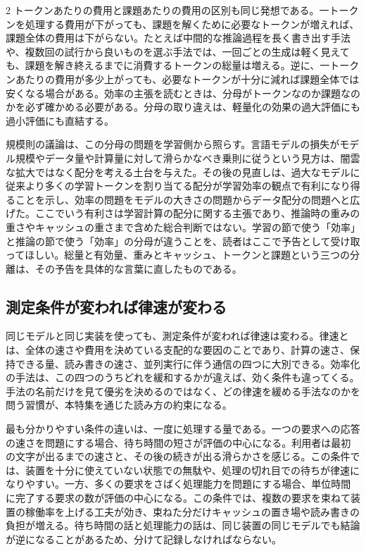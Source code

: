 \documentclass[lualatex,a4paper,10pt]{jlreq}
\begin{document}
\begin{multicols}{2}
トークンあたりの費用と課題あたりの費用の区別も同じ発想である。一トークンを処理する費用が下がっても、課題を解くために必要なトークンが増えれば、課題全体の費用は下がらない。たとえば中間的な推論過程を長く書き出す手法や、複数回の試行から良いものを選ぶ手法では、一回ごとの生成は軽く見えても、課題を解き終えるまでに消費するトークンの総量は増える。逆に、一トークンあたりの費用が多少上がっても、必要なトークンが十分に減れば課題全体では安くなる場合がある。効率の主張を読むときは、分母がトークンなのか課題なのかを必ず確かめる必要がある。分母の取り違えは、軽量化の効果の過大評価にも過小評価にも直結する。

規模則の議論は、この分母の問題を学習側から照らす。言語モデルの損失がモデル規模やデータ量や計算量に対して滑らかなべき乗則に従うという見方は、闇雲な拡大ではなく配分を考える土台を与えた\autocite{kaplan2020}。その後の見直しは、過大なモデルに従来より多くの学習トークンを割り当てる配分が学習効率の観点で有利になり得ることを示し、効率の問題をモデルの大きさの問題からデータ配分の問題へと広げた\autocite{chinchilla}。ここでいう有利さは学習計算の配分に関する主張であり、推論時の重みの重さやキャッシュの重さまで含めた総合判断ではない。学習の節で使う「効率」と推論の節で使う「効率」の分母が違うことを、読者はここで予告として受け取ってほしい。総量と有効量、重みとキャッシュ、トークンと課題という三つの分離は、その予告を具体的な言葉に直したものである。

\subsection{測定条件が変われば律速が変わる}
同じモデルと同じ実装を使っても、測定条件が変われば律速は変わる。律速とは、全体の速さや費用を決めている支配的な要因のことであり、計算の速さ、保持できる量、読み書きの速さ、並列実行に伴う通信の四つに大別できる。効率化の手法は、この四つのうちどれを緩和するかが違えば、効く条件も違ってくる。手法の名前だけを見て優劣を決めるのではなく、どの律速を緩める手法なのかを問う習慣が、本特集を通じた読み方の約束になる。

最も分かりやすい条件の違いは、一度に処理する量である。一つの要求への応答の速さを問題にする場合、待ち時間の短さが評価の中心になる。利用者は最初の文字が出るまでの速さと、その後の続きが出る滑らかさを感じる。この条件では、装置を十分に使えていない状態での無駄や、処理の切れ目での待ちが律速になりやすい。一方、多くの要求をさばく処理能力を問題にする場合、単位時間に完了する要求の数が評価の中心になる。この条件では、複数の要求を束ねて装置の稼働率を上げる工夫が効き、束ねた分だけキャッシュの置き場や読み書きの負担が増える。待ち時間の話と処理能力の話は、同じ装置の同じモデルでも結論が逆になることがあるため、分けて記録しなければならない。


\end{multicols}
\end{document}
